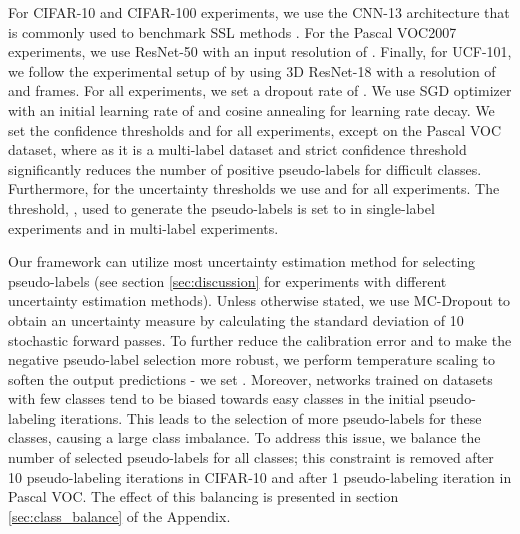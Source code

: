 \documentclass{article} \usepackage{iclr2021_conference,times}
\begin{document}
\label{sec:implementation}
For CIFAR-10 and CIFAR-100 experiments, we use the CNN-13 architecture that is commonly used to benchmark SSL methods \citep{NIPS2018_7585, luo2018smooth}. For the Pascal VOC2007 experiments, we use ResNet-50 \citep{he2016deep} with an input resolution of .  Finally, for UCF-101, we follow the experimental setup of \citep{jing2020videossl} by using 3D ResNet-18 \citep{hara2018can} with a resolution of  and  frames. For all experiments, we set a dropout rate of . We use SGD optimizer with an initial learning rate of  and cosine annealing \citep{loshchilov-ICLR17SGDR} for learning rate decay.
We set the confidence thresholds  and  for all experiments, except on the Pascal VOC dataset, where  as it is a multi-label dataset and strict confidence threshold significantly reduces the number of positive pseudo-labels for difficult classes. Furthermore, for the uncertainty thresholds we use  and  for all experiments. The threshold, , used to generate the pseudo-labels is set to  in single-label experiments and  in multi-label experiments.


Our framework can utilize most uncertainty estimation method for selecting pseudo-labels (see section \ref{sec:discussion} for experiments with different uncertainty estimation methods). Unless otherwise stated, we use MC-Dropout \citep{pmlr-v48-gal16} to obtain an uncertainty measure by calculating the standard deviation of 10 stochastic forward passes.
To further reduce the calibration error and to make the negative pseudo-label selection more robust, we perform temperature scaling to soften the output predictions - we set  \citep{pmlr-v70-guo17a}. 
Moreover, networks trained on datasets with few classes tend to be biased towards easy classes in the initial pseudo-labeling iterations. This leads to the selection of more pseudo-labels for these classes, causing a large class imbalance. 
To address this issue, we balance the number of selected pseudo-labels for all classes;
this constraint is removed after 10 pseudo-labeling iterations in CIFAR-10 and after 1 pseudo-labeling iteration in Pascal VOC. The effect of this balancing is presented in section \ref{sec:class_balance} of the Appendix.
\end{document}
